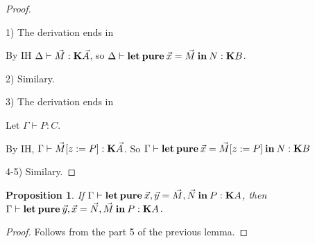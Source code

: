 \documentclass[a4paper]{article}
\newtheorem{prop}{Proposition}
\begin{document}
\begin{proof}
  $ $

1) The derivation ends in

\begin{prooftree}
\end{prooftree}

By IH $\Delta \vdash \vec{M} : {\bf K} \vec{A}$, so $\Delta \vdash {\bf let \: pure \:} \vec{x} = \vec{M} {\: \bf in \: } N : {\bf K}B$.

  \vspace{\baselineskip}

2) Similary.

  \vspace{\baselineskip}

3) The derivation ends in

\begin{prooftree}
\end{prooftree}

Let $\Gamma \vdash P : C$.

By IH, $\Gamma \vdash \vec{M} [z := P] : {\bf K} \vec{A}$. So $\Gamma \vdash {\bf let \: pure \:} \vec{x} = \vec{M} [z := P] {\: \bf in \: } N : {\bf K}B$

  \vspace{\baselineskip}

4-5) Similary.

\end{proof}

\begin{prop}

  If $\Gamma \vdash {\bf let \: pure \:} \vec{x}, \vec{y} = \vec{M}, \vec{N} {\: \bf in \:} P : {\bf K}A$, then
  $\Gamma \vdash {\bf let \: pure \:} \vec{y}, \vec{x} = \vec{N}, \vec{M} {\: \bf in \:} P : {\bf K}A$.
\end{prop}

\begin{proof}

  Follows from the part 5 of the previous lemma.
\end{proof}
\end{document}
